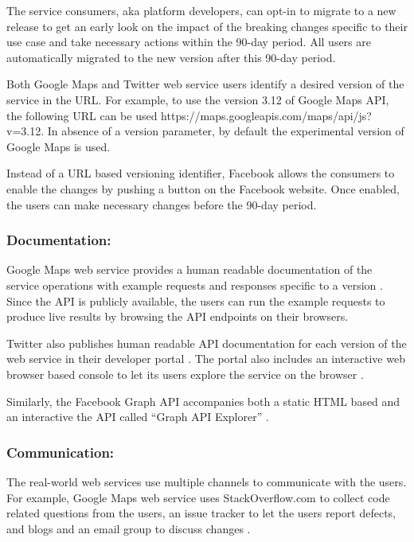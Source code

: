 \documentclass[runningheads,a4paper]{llncs}
\begin{document}
The service consumers, aka platform developers, can opt-in to migrate to a new release to get an early look on the impact of the breaking changes specific to their use case and take necessary actions within the 90-day period. All users are automatically migrated to the new version after this 90-day period.

Both Google Maps and Twitter web service users identify a desired version of the service in the URL. For example, to use the version 3.12 of Google Maps API, the following URL can be used https://maps.googleapis.com/maps/api/js?v=3.12. In absence of a version parameter, by default the experimental version of Google Maps is used.

Instead of a URL based versioning identifier, Facebook allows the consumers to enable the changes by pushing a button on the Facebook website. Once enabled, the users can make necessary changes before the 90-day period.

\subsubsection{Documentation:}
Google Maps web service provides a human readable documentation of the service operations with example requests and responses specific to a version \cite{google_maps_services}. Since the API is publicly available, the users can run the example requests to produce live results by browsing the API endpoints on their browsers.

Twitter also publishes human readable API documentation for each version of the web service in their developer portal \cite{twitter_api}. The portal also includes an interactive web browser based console to let its users explore the service on the browser \cite{twitter_console}.

Similarly, the Facebook Graph API accompanies both a static HTML based and an interactive the API called ``Graph API Explorer'' \cite{facebook_api}.

\subsubsection{Communication:}

The real-world web services use multiple channels to communicate with the users. For example, Google Maps web service uses StackOverflow.com to collect code related questions from the users, an issue tracker to let the users report defects, and blogs and an email group to discuss changes \cite{google_maps_forum}.
\end{document}
